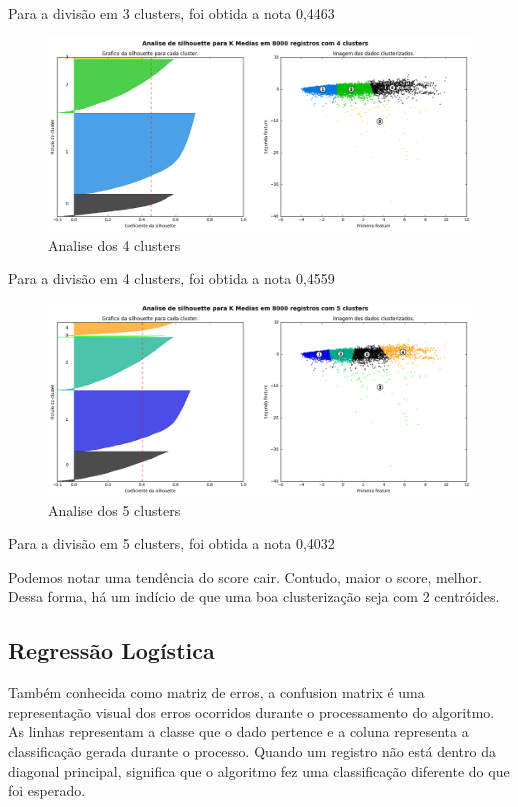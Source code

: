 Para a divisão em 3 clusters, foi obtida a nota 0,4463

\begin{figure}[!ht]
\caption{Analise dos 4 clusters }
\centerline{\includegraphics[width=.8\textwidth]{img/silhoute4}}
\end{figure}

Para a divisão em 4 clusters, foi obtida a nota 0,4559

\begin{figure}[!ht]
\caption{Analise dos 5 clusters }
\centerline{\includegraphics[width=.8\textwidth]{img/silhoute5}}
\end{figure}

Para a divisão em 5 clusters, foi obtida a nota 0,4032

Podemos notar uma tendência do score cair. Contudo, maior o score, melhor. Dessa forma, há um indício de que uma boa clusterização seja com 2 centróides.



\subsection{Regressão Logística}


Também conhecida como matriz de erros, a confusion matrix é uma representação visual dos erros ocorridos durante o processamento do algoritmo. As linhas representam a classe que o dado pertence e a coluna representa a classificação gerada durante o processo. Quando um registro não está dentro da diagonal principal, significa que o algoritmo fez uma classificação diferente do que foi esperado.


